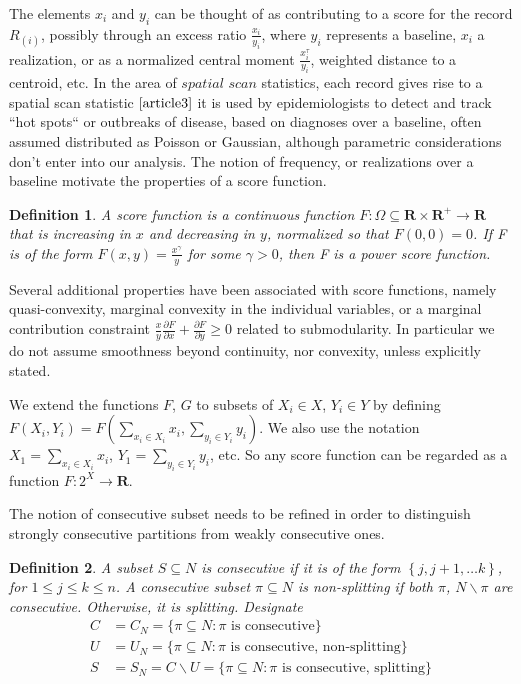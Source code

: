 \documentclass{article}
\newtheorem{definition}{Definition}
\theoremstyle{case}
\begin{document}
The elements $x_i$ and $y_i$ can be thought of as contributing to a score for the record $R_{\left( i\right)}$, possibly through an excess ratio $\frac{x_i}{y_i}$, where $y_i$ represents a baseline, $x_i$ a realization, or as a normalized central moment $\frac{x_i^{\tau}}{y_i}$, weighted distance to a centroid, etc. In the area of $\textit{spatial scan}$ statistics, each record gives rise to a spatial scan statistic $\cite{article3}$ it is used by epidemiologists to detect and track ``hot spots`` or outbreaks of disease, based on diagnoses over a baseline, often assumed distributed as Poisson or Gaussian, although parametric considerations don't enter into our analysis. The notion of frequency, or realizations over a baseline motivate the properties of a score function.

\begin{definition}
A score function is a continuous function $F\colon \Omega \subseteq \mathbf{R} \times \mathbf{R}^{+} \to \mathbf{R}$ that is increasing in $x$ and decreasing in $y$, normalized so that $F\left( 0,0\right) = 0$. If F is of the form $F(x,y) = \frac{x^\gamma}{y}$ for some $\gamma > 0$, then F is a power score function. 
\end{definition}

Several additional properties have been associated with score functions, namely quasi-convexity, marginal convexity in the individual variables, or a marginal contribution constraint $\frac{x}{y} \frac{\partial F}{\partial x} + \frac{\partial F}{\partial y} \geq 0$ related to submodularity. In particular we do not assume smoothness beyond continuity, nor convexity, unless explicitly stated.

We extend the functions $F$, $G$ to subsets of $X_i \in X$, $Y_i \in Y$ by defining $F(X_i, Y_i) = F(\sum_{x_i \in X_i} x_i, \sum_{y_i \in Y_i} y_i)$. We also use the notation $X_1 = \sum_{x_i \in X_i}x_i$, $Y_1 = \sum_{y_i \in Y_i}y_i$, etc. So any score function can be regarded as a function $F \colon 2^X \to \mathbf{R}$.

\vspace{4pt}

The notion of consecutive subset needs to be refined in order to distinguish strongly consecutive partitions from weakly consecutive ones. 

\begin{definition}
A subset $S \subseteq N$ is consecutive if it is of the form $\left\lbrace j, j+1, \dots k\right\rbrace$, for $1 \leq j \leq k \leq n$. A consecutive subset $\pi \subseteq N$ is non-splitting if both $\pi$, $N  \backslash \pi$ are consecutive. Otherwise, it is splitting. Designate
\begin{align*}
C &= C_N = \{ \pi \subseteq N : \pi \textrm{ is consecutive} \}\\
U &= U_N = \{ \pi \subseteq N : \pi \textrm{ is consecutive, non-splitting}\} \\
S &= S_N = C \backslash U = \{ \pi \subseteq N : \pi \textrm{ is consecutive, splitting} \}
\end{align*}
\end{definition}
\end{document}
